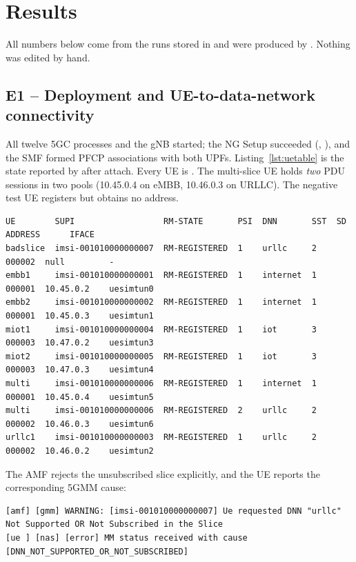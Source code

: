 \section{Results}\label{sec:results}
All numbers below come from the runs stored in  and were produced by
. Nothing was edited by hand.

\subsection{E1 -- Deployment and UE-to-data-network connectivity}\label{sec:e1}
All twelve 5GC processes and the gNB started; the NG Setup succeeded
(, ), and the SMF formed PFCP
associations with both UPFs. Listing~\ref{lst:uetable} is the state reported by
 after attach. Every UE is . The multi-slice UE holds
\emph{two} PDU sessions in two pools (10.45.0.4 on eMBB, 10.46.0.3 on URLLC). The negative
test UE  registers but obtains no address.

\begin{lstlisting}[caption={UE and PDU-session state after E1 attach (\code{results/e1/ue\_table.txt}).},label={lst:uetable}]
UE        SUPI                  RM-STATE       PSI  DNN       SST  SD      ADDRESS      IFACE
badslice  imsi-001010000000007  RM-REGISTERED  1    urllc     2    000002  null         -
embb1     imsi-001010000000001  RM-REGISTERED  1    internet  1    000001  10.45.0.2    uesimtun0
embb2     imsi-001010000000002  RM-REGISTERED  1    internet  1    000001  10.45.0.3    uesimtun1
miot1     imsi-001010000000004  RM-REGISTERED  1    iot       3    000003  10.47.0.2    uesimtun3
miot2     imsi-001010000000005  RM-REGISTERED  1    iot       3    000003  10.47.0.3    uesimtun4
multi     imsi-001010000000006  RM-REGISTERED  1    internet  1    000001  10.45.0.4    uesimtun5
multi     imsi-001010000000006  RM-REGISTERED  2    urllc     2    000002  10.46.0.3    uesimtun6
urllc1    imsi-001010000000003  RM-REGISTERED  1    urllc     2    000002  10.46.0.2    uesimtun2
\end{lstlisting}

\noindent The AMF rejects the unsubscribed slice explicitly, and the UE reports the
corresponding 5GMM cause:
\begin{lstlisting}
[amf] [gmm] WARNING: [imsi-001010000000007] Ue requested DNN "urllc" Not Supported OR Not Subscribed in the Slice
[ue ] [nas] [error] MM status received with cause [DNN_NOT_SUPPORTED_OR_NOT_SUBSCRIBED]
\end{lstlisting}

